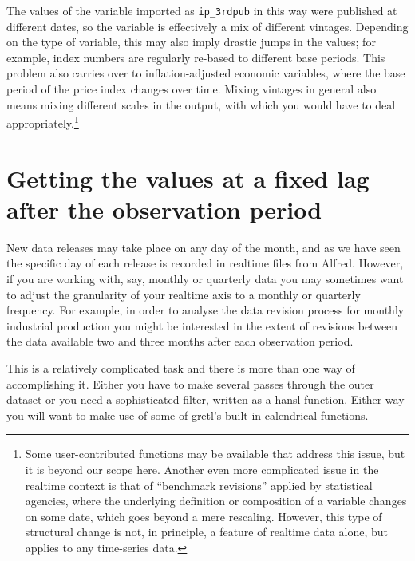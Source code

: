The values of the variable imported as \texttt{ip\_3rdpub} in this way
were published at different dates, so the variable is effectively a
mix of different vintages. Depending on the type of variable, this may
also imply drastic jumps in the values; for example, index numbers are
regularly re-based to different base periods. This problem also carries
over to inflation-adjusted economic variables, where the base period
of the price index changes over time. Mixing vintages in general also
means mixing different scales in the output, with which you would have
to deal appropriately.\footnote{Some user-contributed functions may be
  available that address this issue, but it is beyond our scope
  here. Another even more complicated issue in the realtime context is
  that of ``benchmark revisions'' applied by statistical agencies,
  where the underlying definition or composition of a variable changes
  on some date, which goes beyond a mere rescaling. However, this type
  of structural change is not, in principle, a feature of realtime
  data alone, but applies to any time-series data.}


\section{Getting the values at a fixed lag after the observation
  period}
\label{sec:realtime-fixed-lag}

New data releases may take place on any day of the month, and as we
have seen the specific day of each release is recorded in realtime
files from Alfred. However, if you are working with, say, monthly or
quarterly data you may sometimes want to adjust the granularity of
your realtime axis to a monthly or quarterly frequency. For example,
in order to analyse the data revision process for monthly industrial
production you might be interested in the extent of revisions between
the data available two and three months after each observation period.

This is a relatively complicated task and there is more than one way
of accomplishing it. Either you have to make several passes through
the outer dataset or you need a sophisticated filter, written as a
hansl function. Either way you will want to make use of some of
gretl's built-in calendrical functions.

